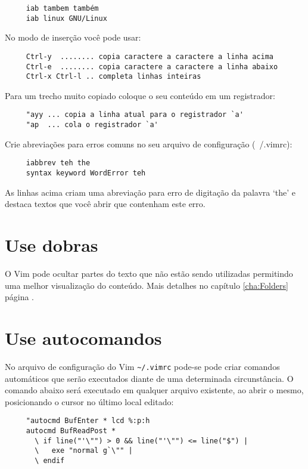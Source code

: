 \begin{verbatim}
     iab tambem também
     iab linux GNU/Linux
\end{verbatim}

No modo de inserção você pode usar:

\begin{verbatim}
     Ctrl-y  ........ copia caractere a caractere a linha acima
     Ctrl-e  ........ copia caractere a caractere a linha abaixo
     Ctrl-x Ctrl-l .. completa linhas inteiras
\end{verbatim}

Para um trecho muito copiado coloque o seu conteúdo em um registrador:

\begin{verbatim}
     "ayy ... copia a linha atual para o registrador `a'
     "ap  ... cola o registrador `a'
\end{verbatim}

Crie abreviações para erros comuns no seu arquivo de configuração (~/.vimrc):

\begin{verbatim}
     iabbrev teh the
     syntax keyword WordError teh
\end{verbatim}

As linhas acima criam uma abreviação para erro de digitação da palavra `the'
e destaca textos que você abrir que contenham este erro.

\section{Use dobras}\label{sec:Use folders}

O Vim pode ocultar partes do texto que não estão sendo utilizadas permitindo
uma melhor visualização do conteúdo. Mais detalhes no capítulo
\ref{cha:Folders} página \pageref{cha:Folders}.

\section{Use autocomandos}
\label{Use autocomandos}

No arquivo de configuração do Vim \verb|~/.vimrc| pode-se pode criar comandos
automáticos que serão executados diante de uma determinada circunstância. 
O comando abaixo será executado em qualquer arquivo existente, ao abrir o mesmo, 
posicionando o cursor no último local editado:

\begin{verbatim}
     "autocmd BufEnter * lcd %:p:h
     autocmd BufReadPost *
       \ if line("'\"") > 0 && line("'\"") <= line("$") |
       \   exe "normal g`\"" |
       \ endif
\end{verbatim}


